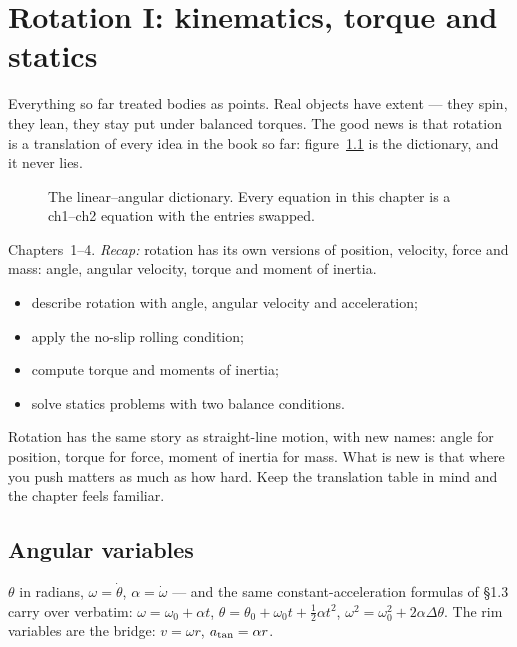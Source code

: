 \chapter{Rotation I: kinematics, torque and statics}\label{ch:rot1}

Everything so far treated bodies as points. Real objects have extent ---
they spin, they lean, they stay put under balanced torques. The good news
is that rotation is a translation of every idea in the book so far:
figure~\ref{fig:dict} is the dictionary, and it never lies.

\begin{figure}[htbp]\centering

\caption{The linear--angular dictionary. Every equation in this chapter is
a ch1--ch2 equation with the entries swapped.}
\label{fig:dict}
\end{figure}

\begin{rulebox}
Chapters~1--4. \emph{Recap:} rotation has its own versions of position, velocity, force and mass: angle, angular velocity, torque and moment of inertia.
\end{rulebox}
\begin{wins}
\begin{itemize}
\item describe rotation with angle, angular velocity and acceleration;
\item apply the no-slip rolling condition;
\item compute torque and moments of inertia;
\item solve statics problems with two balance conditions.
\end{itemize}
\end{wins}
\begin{principle}
Rotation has the same story as straight-line motion, with new names: angle for position, torque for force, moment of inertia for mass. What is new is that where you push matters as much as how hard. Keep the translation table in mind and the chapter feels familiar.
\end{principle}

\section{Angular variables}\label{sec:rot-kin}

$\theta$ in radians, $\omega=\dot\theta$, $\alpha=\dot\omega$ --- and the
same constant-acceleration formulas of \S1.3 carry over verbatim:
$\omega=\omega_0+\alpha t$, $\theta=\theta_0+\omega_0t+\tfrac12\alpha t^{2}$,
$\omega^{2}=\omega_0^{2}+2\alpha\Delta\theta$. The rim variables are the
bridge: $v=\omega r$, $a_{\rm tan}=\alpha r$.

